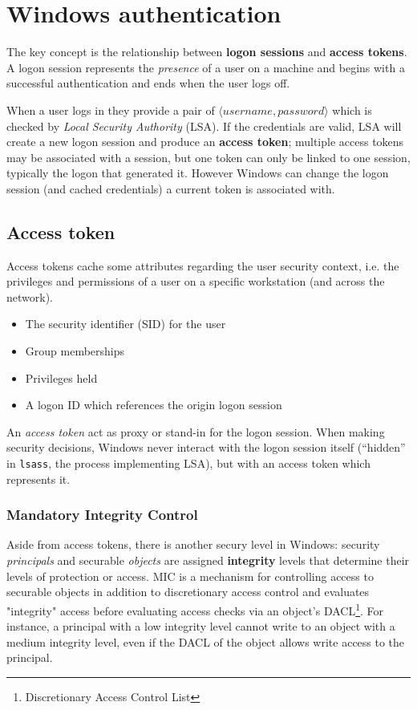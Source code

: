 \chapter{Windows authentication}

The key concept is the relationship between \textbf{logon sessions} and \textbf{access tokens}.
A logon session represents the \textit{presence} of a user on a machine and begins with a successful authentication and ends when the user logs off.

When a user logs in they provide a pair of $\langle username, password \rangle$ which is checked by \textit{Local Security Authority} (LSA).
If the credentials are valid, 
LSA will create a new logon session and produce an
\textbf{access token};
multiple access tokens may be associated with a session, but one
token can only be linked to one session, typically the logon that generated it.
However Windows can change the logon session (and cached credentials) a current token is associated with.

\section{Access token}
Access tokens cache some attributes regarding the user security context, i.e. the privileges and permissions of a user on a specific workstation (and across the network).
\begin{itemize}
   \item The security identifier (SID) for the user
   \item Group memberships
   \item Privileges held
   \item A logon ID which references the origin logon session
\end{itemize}

An \textit{access token} act as proxy or stand-in for the logon session. When making security
decisions, Windows never interact with the logon session itself (“hidden” in \texttt{lsass},
the process implementing LSA), but with an access token which represents it.

\subsection{Mandatory Integrity Control}
Aside from access tokens, there is another secury level in Windows:
security \textit{principals} and securable \textit{objects} are assigned \textbf{integrity} levels that determine their levels of protection or
access.
MIC is a mechanism for controlling access to securable objects in addition to discretionary access control and evaluates "integrity" access before evaluating access checks via an object's DACL\footnote{Discretionary Access Control List}.
For instance, a principal with a low integrity level cannot write to an object with a medium
integrity level, even if the DACL of the object allows write access to the principal.

